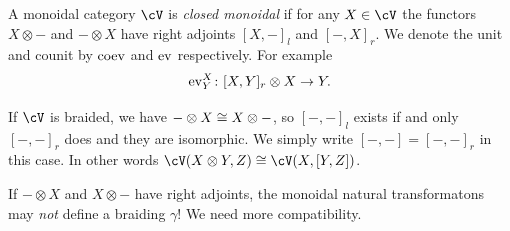\documentclass[a4paper,11pt,oneside,openany]{scrbook}
\begin{document}
\begin{defn}
	A monoidal category $ \cV $ is \emph{closed monoidal} if for any $ X \in \cV $ the functors $ X\otimes - $ and $ -\otimes X $ have right adjoints $ [X,-]_l $ and $ [-,X]_r $.
	We denote the unit and counit by $ \operatorname{coev} $ and $ \operatorname{ev} $ respectively.
	For example
	\begin{displaymath}
		\operatorname{ev}^X_Y \colon [X,Y]_r \otimes X \rightarrow Y.
	\end{displaymath}
\end{defn}
\begin{rmk}
	If $ \cV $ is braided, we have $ -\otimes X \cong X\otimes - $, so $ [-,-]_l $ exists if and only $ [-,-]_r $ does and they are isomorphic.
	We simply write $ [-,-] = [-,-]_r $ in this case.
	In other words $ \cV(X\otimes Y,Z)\iso \cV(X,[Y,Z]) $.
\end{rmk}

\begin{rmk}
	If $ -\otimes X $ and $ X\otimes - $ have right adjoints, the monoidal natural transformatons may \emph{not} define a braiding $ \gamma $!
	We need more compatibility.
\end{rmk}
\end{document}
